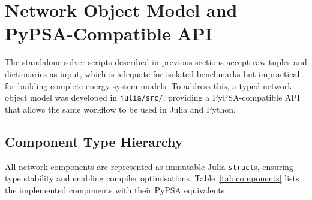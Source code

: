 \section{Network Object Model and PyPSA-Compatible API}
\label{sec:network_model}

The standalone solver scripts described in previous sections accept raw tuples and dictionaries as input, which is adequate for isolated benchmarks but impractical for building complete energy system models. To address this, a typed network object model was developed in \texttt{julia/src/}, providing a PyPSA-compatible API that allows the same workflow to be used in Julia and Python.

\subsection{Component Type Hierarchy}

All network components are represented as immutable Julia \texttt{struct}s, ensuring type stability and enabling compiler optimisations. Table~\ref{tab:components} lists the implemented components with their PyPSA equivalents.


